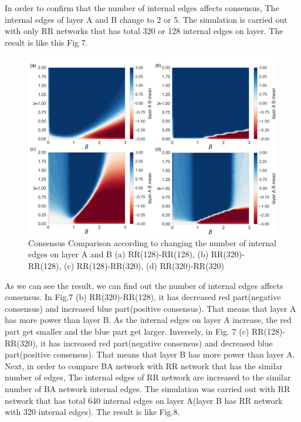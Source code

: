 \documentclass[english]{cccconf}
\begin{document}
In order to confirm that the number of internal edges affects consensus, The internal edges of layer A and B change to 2 or 5. The simulation is carried out with only RR networks that has total 320 or 128 internal edges on layer. The result is like this Fig 7.
\begin{figure}[!htb]
  \centering
  \includegraphics[width=\hsize]{FIG7.png}
  \caption{Consensus Comparison according to changing the number of internal edges on layer A and B (a) RR(128)-RR(128), (b) RR(320)-RR(128), (c) RR(128)-RR(320), (d) RR(320)-RR(320)}
  \label{Fig7}
\end{figure}
As we can see the result, we can find out the number of internal edges affects consensus. In Fig.7 (b) RR(320)-RR(128), it has decreased red part(negative consensus) and increased blue part(positive consensus). That means that layer A has more power than layer B. As the internal edges on layer A increase, the red part get smaller and the blue part get larger.
Inversely, in Fig. 7 (c) RR(128)-RR(320), it has increased red part(negative consensus) and decreased blue part(positive consensus). That means that layer B has more power than layer A.
Next, in order to compare BA network with RR network that has the similar number of edges, The internal edges of RR network are increased to the similar number of BA network internal edges. The simulation was carried out with RR network that has total 640 internal edges on layer A(layer B has RR network with 320 internal edges). The result is like Fig.8.
\end{document}
